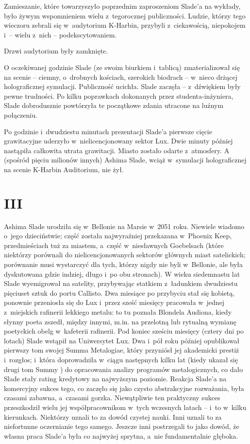 \documentclass[oneside,polish,11pt,rmheadings]{mwbk}
\begin{document}
Zamieszanie, które towarzyszyło poprzednim zaproszeniom Slade'a na wykłady, było żywym wspomnieniem wielu z~tegorocznej publiczności. Ludzie, którzy tego wieczoru zebrali się w~audytorium K-Harbin, przybyli z~ciekawością, niepokojem i~-- wielu z~nich -- podekscytowaniem. 

Drzwi audytorium były zamknięte. 

O oczekiwanej godzinie Slade (ze swoim biurkiem i~tablicą) zmaterializował się na scenie -- ciemny, o~drobnych kościach, szerokich biodrach -- w~nieco drżącej holograficznej symulacji. Publiczność ucichła. Slade zaczęła -- z~dźwiękiem były pewne trudności. Po kilku poprawkach dokonanych przez studenta-inżyniera, Slade dobrodusznie powtórzyła te początkowe zdania utracone na luźnym połączeniu. 

Po godzinie i~dwudziestu minutach prezentacji Slade'a pierwsze cięcie grawitacyjne uderzyło w~nielicencjonowany sektor Lux. Dwie minuty później nastąpiła całkowita utrata grawitacji. Miasto zostało odarte z~atmosfery. A (spośród pięciu milionów innych) Ashima Slade, wciąż w~symulacji holograficznej na scenie K-Harbin Auditorium, nie żył. 

\section*{III}


Ashima Slade urodziła się w~Bellonie na Marsie w~2051 roku. Niewiele wiadomo o~jego dzieciństwie; część została najwyraźniej przekazana w~Phoenix Keep, przedmieściach tuż za miastem, a~część w~niesławnych Goebelsach (które niektórzy porównali do nielicencjonowanych sektorów głównych miast satelickich; porównanie musi wystarczyć dla tych, którzy nigdy nie byli w~Bellonie, ale była dyskutowana gdzie indziej, długo i~po obu stronach). W wieku siedemnastu lat Slade wyemigrował na satelity, przybywając statkiem z~ładunkiem dwudziestu pięciuset sztuk do portu Callisto. Dwa miesiące po przybyciu stał się kobietą, ponownie przeniosła się do Lux i~przez sześć miesięcy pracowała w~jednej z~miejskich rafinerii lekkiego metalu: to tu poznała Blondela Audiona, kiedy słynny poeta zszedł, między innymi, m.in. na przelotną lub rytualną wymianę poetyckich obelg w~kafeterii rafinerii. Pod koniec sześciu miesięcy (cztery dni po lotach) Slade wstąpił na Uniwersytet Lux. Dwa i~pół roku później opublikował pierwszy tom swojej Summa Metalogiae, który przyniósł jej akademicki prestiż i~rozgłos; i~która doprowadziła w~ciągu następnych kilku lat (kiedy ukazał się drugi tom Summy ) do opracowania analizy programów metalogicznych, co dało Slade stały rating kredytowy na najwyższym poziomie. Reakcja Slade'a na komercyjny sukces tego, co zaczęło się jako czysto abstrakcyjne rozważania, była czasami zabawna, a~czasami gorzka. Niewątpliwie ten praktyczny sukces przeszkodził wielu jej współpracownikom w~tych wczesnych latach -- i~to w~kilku kierunkach. Niektórzy uznali to za dowód czystej nauki. Inni uznali to za niefortunne oczernianie tego samego. Jeszcze inni postrzegali to jako dowód, że własna praca Slade'a była co najwyżej sprytna, a~nie fundamentalnie głęboka. 
\end{document}
